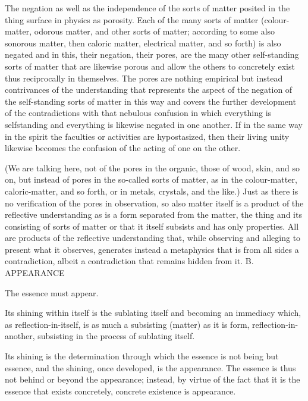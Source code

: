     The negation as well as the independence of the sorts of matter
    posited in the thing surface in physics as porosity.
    Each of the many sorts of matter
    (colour-matter, odorous matter, and other sorts of matter;
    according to some also sonorous matter, then caloric matter,
    electrical matter, and so forth)
    is also negated and in this, their negation,
    their pores, are the many other self-standing sorts of
    matter that are likewise porous and allow the others to concretely
    exist thus reciprocally in themselves.
    The pores are nothing empirical but instead contrivances of
    the understanding that represents the
    aspect of the negation of the self-standing sorts of matter in this
    way and covers the further development of the contradictions with
    that nebulous confusion in which everything is selfstanding and
    everything is likewise negated in one another.
    If in the same way in the spirit
    the faculties or activities are hypostasized,
    then their living unity likewise becomes
    the confusion of the acting of one on the other.

    (We are talking here, not of the pores in the organic, those of
    wood, skin, and so on, but instead of pores in the so-called sorts
    of matter, as in the colour-matter, caloric-matter, and so forth, or
    in metals, crystals, and the like.)
    Just as there is no verification of
    the pores in observation, so also matter itself is a product of the
    reflective understanding as is a form separated from the matter, the
    thing and its consisting of sorts of matter or that it itself subsists and
    has only properties. All are products of the reflective understanding
    that, while observing and alleging to present what it observes,
    generates instead a metaphysics that is from all sides a contradiction,
    albeit a contradiction that remains hidden from it.
B. APPEARANCE

The essence must appear.

Its shining within itself is
the sublating itself and
becoming an immediacy which,
as reflection-in-itself, is
as much a subsisting (matter)
as it is form, reflection-in-another,
subsisting in the process of sublating itself.

Its shining is the determination through which
the essence is not being but essence,
and the shining, once developed, is the appearance.
The essence is thus not behind or beyond the appearance;
instead, by virtue of the fact that it is
the essence that exists concretely,
concrete existence is appearance.

